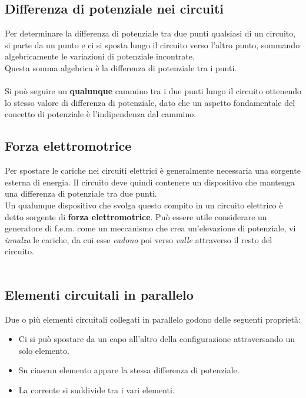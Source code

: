 \subsection{Differenza di potenziale nei circuiti}
Per determinare la differenza di potenziale tra due punti qualsiasi di un circuito, si parte da un punto e ci si sposta lungo il circuito verso l'altro punto, sommando algebricamente le variazioni di potenziale incontrate.\\
Questa somma algebrica è la differenza di potenziale tra i punti.\\\\
Si può seguire un \textbf{qualunque} cammino tra i due punti lungo il circuito ottenendo lo stesso valore di differenza di potenziale, dato che un aspetto fondamentale del concetto di potenziale è l'indipendenza dal cammino.

\subsection{Forza elettromotrice}
Per spostare le cariche nei circuiti elettrici è generalmente necessaria una sorgente esterna di energia. Il circuito deve quindi contenere un dispositivo che mantenga una differenza di potenziale tra due punti.\\
Un qualunque dispositivo che svolga questo compito in un circuito elettrico è detto sorgente di \textbf{forza elettromotrice}. Può essere utile considerare un generatore di f.e.m. come un meccanismo che crea un'elevazione di potenziale, vi \textit{innalza} le cariche, da cui esse \textit{cadono} poi verso \textit{valle} attraverso il resto del circuito.\\\\

\subsection*{Elementi circuitali in parallelo}
Due o più elementi circuitali collegati in parallelo godono delle seguenti proprietà:
\begin{itemize}
\item{Ci si può spostare da un capo all'altro della configurazione attraversando un solo elemento.}
\item{Su ciascun elemento appare la stessa differenza di potenziale.}
\item{La corrente si suddivide tra i vari elementi.}
\end{itemize}

